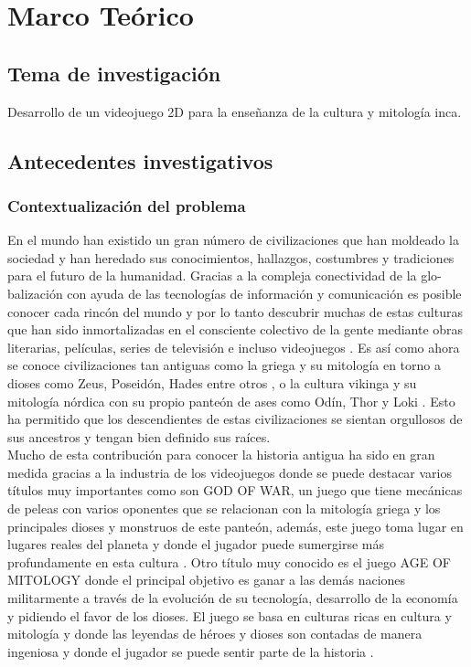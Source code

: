 \documentclass[a4paper, openright, 12pt]{report}
\begin{document}
\chapter{Marco Teórico}
\section{Tema de investigación}
\justify
Desarrollo de un videojuego 2D para la enseñanza de la cultura y mitología inca.

\section{Antecedentes investigativos}

\subsection{Contextualización del problema}
\justify
En el mundo han existido un gran número de civilizaciones que han moldeado la sociedad y han heredado sus conocimientos, hallazgos, costumbres y tradiciones para el futuro de la humanidad. Gracias a la compleja conectividad de la glo-balización con ayuda de las tecnologías de información y comunicación es posible conocer cada rincón del mundo y por lo tanto descubrir muchas de estas culturas que han sido inmortalizadas en el consciente colectivo de la gente mediante obras literarias, películas, series de televisión e incluso videojuegos \cite{tomlinson2013}. Es así como ahora se conoce civilizaciones tan antiguas como la griega y su mitología en torno a dioses como Zeus, Poseidón, Hades entre otros \cite{grimal1991}, o la cultura vikinga y su mitología nórdica con su propio panteón de ases como Odín, Thor y Loki \cite{alvarez2002}. Esto ha permitido que los descendientes de estas civilizaciones se sientan orgullosos de sus ancestros y tengan bien definido sus raíces.\\
Mucho de esta contribución para conocer la historia antigua ha sido en gran medida gracias a la industria de los videojuegos donde se puede destacar varios títulos muy importantes como son GOD OF WAR, un juego que tiene mecánicas de peleas con varios oponentes que se relacionan con la mitología griega y los principales dioses y monstruos de este panteón, además, este  juego toma lugar en lugares reales del planeta y donde el jugador puede sumergirse más profundamente en esta cultura \cite{mobygames2005}. Otro título muy conocido es el juego AGE OF MITOLOGY donde el principal objetivo es ganar a las demás naciones militarmente a través de la evolución de su tecnología, desarrollo de la economía y pidiendo el favor de los dioses. El juego se basa en culturas ricas en cultura y mitología y donde las leyendas de héroes y dioses son contadas de manera ingeniosa y donde el jugador se puede sentir parte de la historia \cite{mobygames2003}.\\
\end{document}
